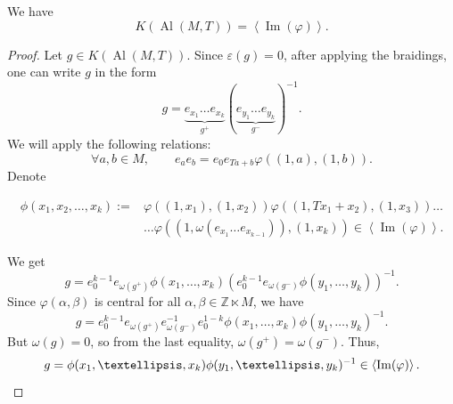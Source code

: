 \documentclass[10pt,a4paper]{amsart}
\DeclareMathOperator{\Al}{Al}
\newcommand{\Z}{{\mathbb Z}}
\DeclareMathOperator{\im}{Im}
\begin{document}
\begin{prop}
We have
\[
K(\Al(M,T)) = \left< \im(\varphi) \right> .
\]
\end{prop}

\begin{proof}
Let $g\in K(\Al(M,T))$.
Since $\varepsilon(g)=0$, after applying the braidings, one can write $g$ in the form
\[
g= \underbrace{e_{x_1}\ldots e_{x_k}}_{g^+} ( \underbrace{e_{y_1} \ldots e_{y_k}}_{g^-} )^{-1}.
\]
We will apply the following relations:
\[
\forall a,b\in M, \qquad e_a e_b = e_0 e_{Ta+b} \varphi((1,a),(1,b)).
\]
Denote

\[
\begin{array}{ll}
\phi(x_1, x_2, \ldots,x_k):= & \varphi((1,x_1),(1,x_2)) \varphi((1,Tx_1+x_2),(1,x_3)) \ldots\\
& \ldots \varphi( (1,\omega(e_{x_1}\ldots e_{x_{k-1}})), (1,x_k))\in \left<\im(\varphi)\right>.
\end{array}
\]

We get
\[
g=e_0^{k-1} e_{\omega(g^+)} \phi(x_1,\ldots, x_k) \left(e_0^{k-1} e_{\omega(g^-)} \phi(y_1,\ldots,y_k)\right)^{-1}.
\]
Since $\varphi(\alpha,\beta)$ is central for all $\alpha,\beta\in \Z\ltimes M$, we have
\[
g = e_0^{k-1} e_{\omega(g^+)} e^{-1}_{\omega(g^-)} e_0^{1-k} \phi(x_1,\ldots, x_k) \phi(y_1,\ldots,y_k)^{-1}.
\]
But $\omega(g) = 0$, so from the last equality, $\omega(g^+)=\omega(g^-)$.
Thus,
\[
g= \phi(x_1,\ldots, x_k) \phi(y_1,\ldots,y_k)^{-1} \in \left<\im(\varphi)\right>. \qedhere
\]
\end{proof}
\end{document}
